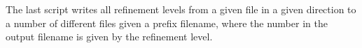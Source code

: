 \documentclass{article}
\begin{document}
The last script writes all refinement levels from a given file in a
given direction to a number of different files given a prefix
filename, where the number in the output filename is given by the
refinement level.


%

\end{document}
